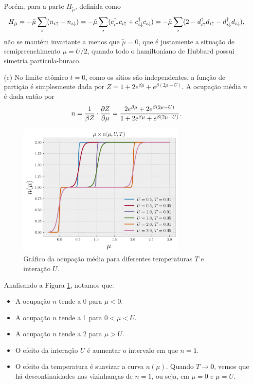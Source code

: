 \documentclass[a4paper,10pt]{article}
\begin{document}
Porém, para a parte $H_{\tilde{\mu}}$, definida como
$$
H_{\tilde{\mu}} =
-\tilde{\mu} \sum_{i} (n_{i\uparrow} + n_{i\downarrow}) =
-\tilde{\mu} \sum_{i} (c_{i\uparrow}^\dagger c_{i\uparrow} + c_{i\downarrow}^\dagger c_{i\downarrow}) =
-\tilde{\mu} \sum_{i} (2 - d_{i\uparrow}^\dagger d_{i\uparrow} - d_{i\downarrow}^\dagger d_{i\downarrow}),
$$
não se mantém invariante a menos que $\tilde{\mu} = 0$, que é justamente a situação de semipreenchimento $\mu = U/2$, quando todo o hamiltoniano de Hubbard possui simetria partícula-buraco.

\n

(c) No limite atômico $t = 0$, como os sítios são independentes, a função de partição é simplesmente dada por $Z = 1 + 2 e^{\beta \mu} + e^{\beta(2\mu - U)}$. A ocupação média $n$ é dada então por
$$
n = \frac{1}{\beta Z} \cdot \pdv{Z}{\mu} =
\frac{2 e^{\beta\mu} + 2 e^{\beta(2\mu-U)}}{1 + 2 e^{\beta \mu} + e^{\beta(2\mu - U)}}.
$$

\begin{figure}[H]
\centering
\includegraphics[width=0.75\textwidth]{fig/occup.png}
\caption{Gráfico da ocupação média para diferentes temperaturas $T$ e interação $U$.}
\label{fig:occup}
\end{figure}

Analisando a Figura \ref{fig:occup}, notamos que:
\begin{itemize}
\item A ocupação $n$ tende a 0 para $\mu < 0$.
\item A ocupação $n$ tende a 1 para $0 < \mu < U$.
\item A ocupação $n$ tende a 2 para $\mu > U$.
\item O efeito da interação $U$ é aumentar o intervalo em que $n = 1$.
\item O efeito da temperatura é suavizar a curva $n(\mu)$. Quando $T \to 0$, vemos que há descontinuidades nas vizinhanças de $n = 1$, ou seja, em $\mu = 0$ e $\mu = U$.
\end{itemize}
\end{document}
